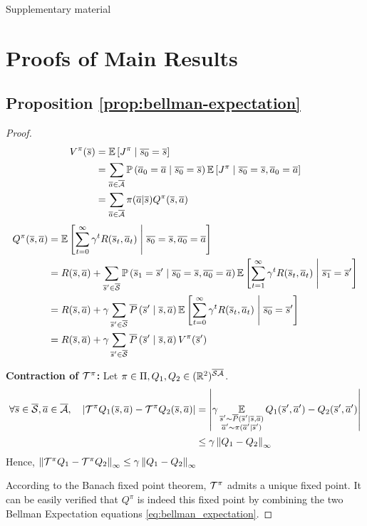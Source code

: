 % 

\begin{center}
\LARGE Supplementary material
\end{center}
\appendix

\section{Proofs of Main Results}
\label{sec:proofs}
\subsection{Proposition \ref{prop:bellman-expectation}}

\begin{proof}
\begin{align*}
    V^\pi(\os) &= \expectedvalue\left[ J^\pi \condbar \ov{s_0} = \os\right] \\
    &=\sum_{\oa\in\ocA} \probability{\oa_0 = \oa \condbar\ov{s_0} = \os} \expectedvalue\left[ J^\pi \condbar \ov{s_0} = \os, \oa_0 = \oa\right]\\
    &= \sum_{\oa\in\ocA} \pi(\oa | \os) Q^\pi(\os,\oa)
\end{align*}
\begin{align*}
    Q^\pi(\os, \oa) &= \expectedvalue\left[\sum_{t=0}^\infty \gamma^t R(\os_t, \oa_t)\condbar \ov{s_0} = \os, \ov{a_0} = \oa\right] \\
    &= R(\os, \oa) + \sum_{\os'\in\ocS}\probability{\os_1 = \os' \condbar\ov{s_0} = \os, \ov{a_0} = \oa}\expectedvalue\left[\sum_{t=1}^\infty \gamma^t R(\os_t, \oa_t)\condbar \ov{s_1} = \os'\right] \\
    &= R(\os, \oa) + \gamma\sum_{\os'\in\ocS}\ov{P}\left(\os' \condbar\os, \oa\right) \expectedvalue\left[\sum_{t=0}^\infty \gamma^t R(\os_t, \oa_t) \condbar \ov{s_0} = \os'\right] \\
    &=  R(\os, \oa) + \gamma\sum_{\os'\in\ocS}\ov{P}\left(\os' \condbar\os, \oa\right) V^\pi(\os')
\end{align*}

\textbf{Contraction of $\cT^\pi$:}
Let $\pi\in\Pi, Q_1, Q_2\in(\Real^2)^{\ocS\ocA}$.
\begin{align*}
    \forall \os\in\ocS, \oa\in\ocA,\quad \left|\cT^\pi Q_1(\os,\oa) - \cT^\pi Q_2(\os,\oa)\right| &= \left|\gamma\expectedvalueover{\substack{\os'\sim\ov{P}(\os'|\os,\oa) \\ \oa'\sim\pi(\oa'|\os')}} Q_1(\os',\oa') - Q_2(\os',\oa')\right|\\
    &\leq \gamma\left\|Q_1-Q_2\right\|_\infty
\end{align*}
Hence, $\left\|\cT^\pi Q_1  - \cT^\pi Q_2 \right\|_\infty \leq \gamma\left\|Q_1-Q_2\right\|_\infty$

According to the Banach fixed point theorem, $\cT^\pi$ admits a unique fixed point.
It can be easily verified that $Q^\pi$ is indeed this fixed point by combining the two Bellman Expectation equations \eqref{eq:bellman_expectation}.

\end{proof}

